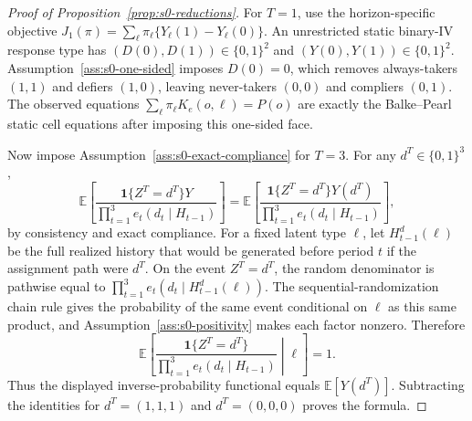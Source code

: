 \documentclass[11pt]{article}
\newcommand{\E}{\mathbb{E}}
\newcommand{\one}{\mathbf{1}}
\theoremstyle{definition}
\theoremstyle{plain}
\theoremstyle{remark}
\begin{document}
\begin{proof}[Proof of Proposition~\ref{prop:s0-reductions}]
For \(T=1\), use the horizon-specific objective \(J_1(\pi)=\sum_\ell\pi_\ell\{Y_\ell(1)-Y_\ell(0)\}\).  An unrestricted static binary-IV response type has \((D(0),D(1))\in\{0,1\}^2\) and \((Y(0),Y(1))\in\{0,1\}^2\).  Assumption~\ref{ass:s0-one-sided} imposes \(D(0)=0\), which removes always-takers \((1,1)\) and defiers \((1,0)\), leaving never-takers \((0,0)\) and compliers \((0,1)\).  The observed equations \(\sum_\ell\pi_\ell K_e(o,\ell)=P(o)\) are exactly the Balke--Pearl static cell equations after imposing this one-sided face.

Now impose Assumption~\ref{ass:s0-exact-compliance} for \(T=3\).  For any \(d^T\in\{0,1\}^3\),
\[
\E\left[
\frac{\one\{Z^T=d^T\}Y}
{\prod_{t=1}^3 e_t(d_t\mid H_{t-1})}
\right]
=
\E\left[
\frac{\one\{Z^T=d^T\}Y(d^T)}
{\prod_{t=1}^3 e_t(d_t\mid H_{t-1})}
\right],
\]
by consistency and exact compliance.  For a fixed latent type \(\ell\), let \(H_{t-1}^{d}(\ell)\) be the full realized history that would be generated before period \(t\) if the assignment path were \(d^T\).  On the event \(Z^T=d^T\), the random denominator is pathwise equal to \(\prod_{t=1}^3 e_t(d_t\mid H_{t-1}^{d}(\ell))\).  The sequential-randomization chain rule gives the probability of the same event conditional on \(\ell\) as this same product, and Assumption~\ref{ass:s0-positivity} makes each factor nonzero.  Therefore
\[
\E\left[
\frac{\one\{Z^T=d^T\}}
{\prod_{t=1}^3 e_t(d_t\mid H_{t-1})}
\middle| \ell\right]=1.
\]
Thus the displayed inverse-probability functional equals \(\E[Y(d^T)]\).  Subtracting the identities for \(d^T=(1,1,1)\) and \(d^T=(0,0,0)\) proves the formula.
\end{proof}
\end{document}
